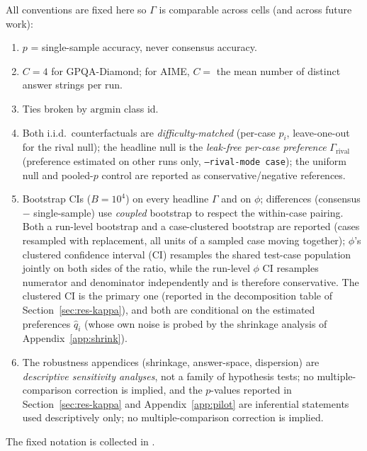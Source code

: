 \documentclass[a4paper,fleqn]{cas-sc}
\newcommand{\agreementIndex}{\Gamma}
\begin{document}
All conventions are fixed here so $\agreementIndex$ is comparable across cells
(and across future work):
\begin{enumerate}
\item $p$ = single-sample accuracy, never consensus accuracy.
\item $C=4$ for GPQA-Diamond; for AIME, $C=$ the mean number of distinct answer strings per run.
\item Ties broken by $\mathrm{argmin}$ class id.
\item Both i.i.d.\ counterfactuals are \emph{difficulty-matched}
  (per-case $p_i$, leave-one-out for the rival null); the headline null
  is the \emph{leak-free per-case
  preference} $\agreementIndex_{\mathrm{rival}}$ (preference estimated on other runs
  only, \texttt{--rival-mode case}); the uniform null and pooled-$p$
  control are reported as conservative/negative references.
\item Bootstrap CIs ($B=10^4$) on every headline $\agreementIndex$ and on
  $\phi$; differences (consensus $-$ single-sample) use \emph{coupled}
  bootstrap to respect the within-case pairing. Both a run-level bootstrap and a case-clustered bootstrap are reported (cases
  resampled with replacement, all units of a sampled case moving
  together); $\phi$'s clustered confidence interval (CI) resamples the shared test-case
  population jointly on both sides of the ratio, while the run-level
  $\phi$ CI resamples numerator and denominator independently and is
  therefore conservative. The clustered CI is the
  primary one (reported in the decomposition table of
  Section~\ref{sec:res-kappa}), and both are conditional on the
  estimated preferences $\hat q_i$ (whose own noise is probed by the
  shrinkage analysis of Appendix~\ref{app:shrink}).
\item The robustness appendices (shrinkage, answer-space, dispersion)
  are \emph{descriptive sensitivity analyses}, not a family of
  hypothesis tests; no multiple-comparison correction is implied, and
  the $p$-values reported in Section~\ref{sec:res-kappa} and
  Appendix~\ref{app:pilot} are inferential statements used
  descriptively only; no multiple-comparison correction is implied.
\end{enumerate}
The fixed notation is collected in .
\end{document}
